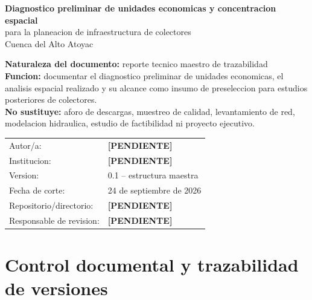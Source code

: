 \documentclass[11pt,letterpaper]{article}
\newcommand{\pendiente}{\textcolor{AtoyacRed}{\textbf{[PENDIENTE]}}}
\begin{document}
\begin{titlepage}
\centering
\vspace*{2.0cm}
{\Huge\bfseries\color{AtoyacBlue} Diagnostico preliminar de unidades economicas y concentracion espacial\\[0.5em]}
{\LARGE para la planeacion de infraestructura de colectores\\[1.0em]}
{\Large Cuenca del Alto Atoyac}\par
\vspace{1.8cm}

\begin{tcolorbox}[colback=AtoyacLight,colframe=AtoyacGreen,width=0.9\textwidth]
\centering
\textbf{Naturaleza del documento:} reporte tecnico maestro de trazabilidad\\[0.4em]
\textbf{Funcion:} documentar el diagnostico preliminar de unidades economicas, el analisis espacial realizado y su alcance como insumo de preseleccion para estudios posteriores de colectores.\\[0.4em]
\textbf{No sustituye:} aforo de descargas, muestreo de calidad, levantamiento de red, modelacion hidraulica, estudio de factibilidad ni proyecto ejecutivo.
\end{tcolorbox}

\vfill
\begin{tabular}{ll}
Autor/a: & \pendiente \\
Institucion: & \pendiente \\
Version: & 0.1 -- estructura maestra \\
Fecha de corte: & 24 de septiembre de 2026 \\
Repositorio/directorio: & \pendiente \\
Responsable de revision: & \pendiente \\
\end{tabular}
\vfill
\end{titlepage}

\tableofcontents
\newpage

\section{Control documental y trazabilidad de versiones}
\end{document}
